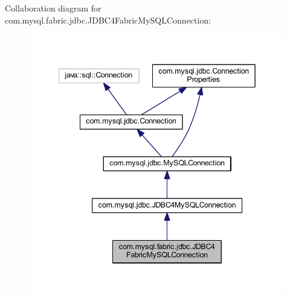 Collaboration diagram for com.\+mysql.\+fabric.\+jdbc.\+J\+D\+B\+C4\+Fabric\+My\+S\+Q\+L\+Connection\+:\nopagebreak
\begin{figure}[H]
\begin{center}
\leavevmode
\includegraphics[width=342pt]{interfacecom_1_1mysql_1_1fabric_1_1jdbc_1_1_j_d_b_c4_fabric_my_s_q_l_connection__coll__graph}
\end{center}
\end{figure}
